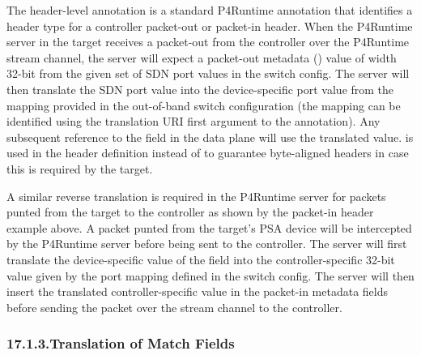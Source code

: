 \documentclass[11pt]{article}
\begin{document}
{%
\noindent{}The header-level annotation  is a standard P4Runtime
annotation that identifies a header type for a controller packet-out or
packet-in header. When the P4Runtime server in the target receives a packet-out
from the controller over the P4Runtime stream channel, the server will expect a
packet-out metadata () value of width 32-bit from the given set of
SDN port values in the switch config. The server will then translate the SDN
port value into the device-specific port value from the mapping provided in the
out-of-band switch configuration (the mapping can be identified using the
translation URI \textemdash{} first argument to the 
annotation). Any subsequent reference to the  field in the
data plane will use the translated value.  is used in the
header definition instead of  to guarantee byte-aligned headers in
case this is required by the target.%

A similar reverse translation is required in the P4Runtime server for packets
punted from the target to the controller as shown by the packet-in header
example above. A packet punted from the target's PSA device will be intercepted
by the P4Runtime server before being sent to the controller. The server will
first translate the device-specific value of the  field into the
controller-specific 32-bit value given by the port mapping defined in the switch
config. The server will then insert the translated controller-specific value in
the packet-in metadata fields before sending the packet over the stream channel
to the controller.%

\subsubsection{17.1.3.\hspace*{0.5em}Translation of Match Fields}\label{sec-translation-of-match-fields}%

}
\end{document}
